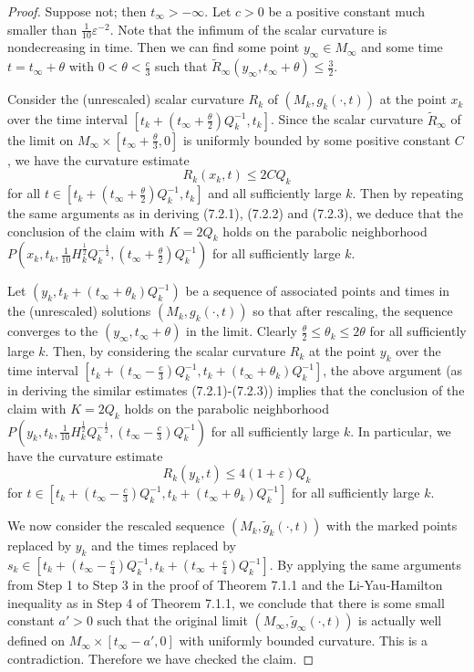 \begin{proof}
Suppose not; then $t_{\infty} > -\infty.$ Let $c>0$ be a positive
constant much smaller than $\frac{1}{10}\varepsilon^{-2}$. Note
that the infimum of the scalar curvature is nondecreasing in time.
Then we can find some point $y_{\infty} \in M_{\infty}$ and some
time $t=t_{\infty} + \theta$ with $0<\theta<\frac{c}{3}$ such that
$\tilde{R}_{\infty}(y_{\infty},t_{\infty}+\theta) \leq
\frac{3}{2}$.

Consider the (unrescaled) scalar curvature $R_k$ of
$(M_k,{g}_k(\cdot,t))$ at the point $x_k$ over the time interval
$[t_k+(t_{\infty}+\frac{\theta}{2})Q_k^{-1},t_k]$. Since the
scalar curvature $\tilde{R}_{\infty}$ of the limit on
$M_{\infty}\times [t_{\infty}+\frac{\theta}{3},0]$ is uniformly
bounded by some positive constant $C$, we have the curvature
estimate $$R_k(x_k,t) \leq 2CQ_k$$ for all $t \in
[t_k+(t_{\infty}+\frac{\theta}{2})Q_k^{-1},t_k]$ and all
sufficiently large $k$. Then by repeating the same arguments as in
deriving (7.2.1), (7.2.2) and (7.2.3), we deduce that the
conclusion of the claim with $K=2Q_k$ holds on the parabolic
neighborhood
$P(x_k,t_k,\frac{1}{10}H_k^{\frac{1}{2}}Q_k^{-\frac{1}{2}},
(t_{\infty}+\frac{\theta}{2})Q_k^{-1})$ for all sufficiently large
$k$.

Let $(y_k,t_k+(t_{\infty}+\theta_k)Q_k^{-1})$ be a sequence of
associated points and times in the (unrescaled) solutions
$(M_k,g_k(\cdot,t))$ so that after rescaling, the sequence
converges to the $(y_{\infty},t_{\infty}+\theta)$ in the limit.
Clearly $\frac{\theta}{2}\leq \theta_k \leq 2\theta$ for all
sufficiently large $k$. Then, by considering the scalar curvature
$R_k$ at the point $y_k$ over the time interval
$[t_k+(t_{\infty}-\frac{c}{3})Q_k^{-1},t_k+(t_{\infty}+\theta_k)Q_k^{-1}]$,
the above argument (as in deriving the similar estimates
(7.2.1)-(7.2.3)) implies that the conclusion of the claim with
$K=2Q_k$ holds on the parabolic neighborhood
$P(y_k,t_k,\frac{1}{10}H_k^{\frac{1}{2}}Q_k^{-\frac{1}{2}},
(t_{\infty}-\frac{c}{3})Q_k^{-1})$ for all sufficiently large $k$.
In particular, we have the curvature estimate
$$
R_k(y_k,t) \leq 4(1+\varepsilon)Q_k
$$
for $t \in [t_k+(t_{\infty}-\frac{c}{3})Q_k^{-1},
t_k+(t_{\infty}+\theta_k)Q_k^{-1}]$ for all sufficiently large
$k$.

We now consider the rescaled sequence $(M_k,\tilde{g}_k(\cdot,t))$
with the marked points replaced by $y_k$ and the times replaced by
$s_k \in [t_k+(t_{\infty}-\frac{c}{4})Q_k^{-1},
t_k+(t_{\infty}+\frac{c}{4})Q_k^{-1}]$. By applying the same
arguments from Step 1 to Step 3 in the proof of Theorem 7.1.1 and
the Li-Yau-Hamilton inequality as in Step 4 of Theorem 7.1.1, we
conclude that there is some small constant $a'>0$ such that the
original limit $(M_{\infty},\tilde{g}_{\infty}(\cdot,t))$ is
actually well defined on $M_{\infty} \times [t_{\infty}-a',0]$
with uniformly bounded curvature. This is a contradiction.
Therefore we have checked the claim.


\end{proof}
